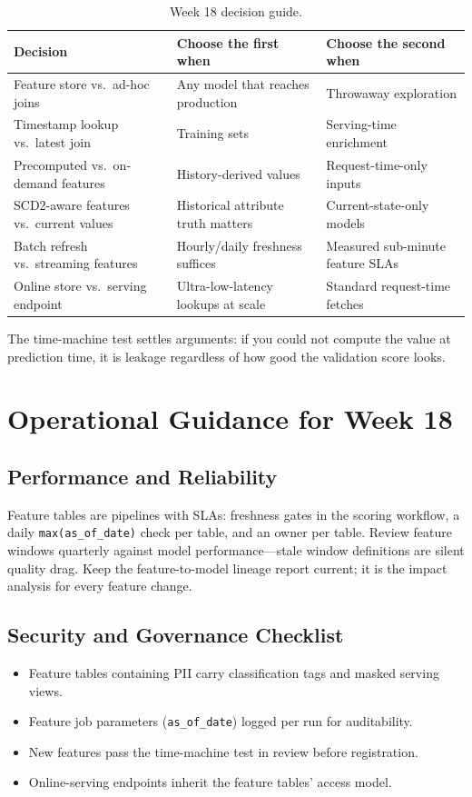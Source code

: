 \begin{table}[H]
\centering
\small
\begin{tabular}{@{}p{3.4cm}p{4.4cm}p{4.6cm}@{}}
\toprule
\textbf{Decision} & \textbf{Choose the first when} & \textbf{Choose the second when} \\
\midrule
Feature store vs.\ ad-hoc joins & Any model that reaches production & Throwaway exploration \\
Timestamp lookup vs.\ latest join & Training sets & Serving-time enrichment \\
Precomputed vs.\ on-demand features & History-derived values & Request-time-only inputs \\
SCD2-aware features vs.\ current values & Historical attribute truth matters & Current-state-only models \\
Batch refresh vs.\ streaming features & Hourly/daily freshness suffices & Measured sub-minute feature SLAs \\
Online store vs.\ serving endpoint & Ultra-low-latency lookups at scale & Standard request-time fetches \\
\bottomrule
\end{tabular}
\caption{Week 18 decision guide.}
\label{tab:ch18-decisions}
\end{table}

The time-machine test settles arguments: if you could not compute the value at prediction time, it is leakage regardless of how good the validation score looks.

\section{Operational Guidance for Week 18}
%
\subsection{Performance and Reliability}
Feature tables are pipelines with SLAs: freshness gates in the scoring workflow, a daily \texttt{max(as\_of\_date)} check per table, and an owner per table. Review feature windows quarterly against model performance---stale window definitions are silent quality drag. Keep the feature-to-model lineage report current; it is the impact analysis for every feature change.

\subsection{Security and Governance Checklist}
\begin{itemize}
    \item Feature tables containing PII carry classification tags and masked serving views.
    \item Feature job parameters (\texttt{as\_of\_date}) logged per run for auditability.
    \item New features pass the time-machine test in review before registration.
    \item Online-serving endpoints inherit the feature tables' access model.
\end{itemize}

